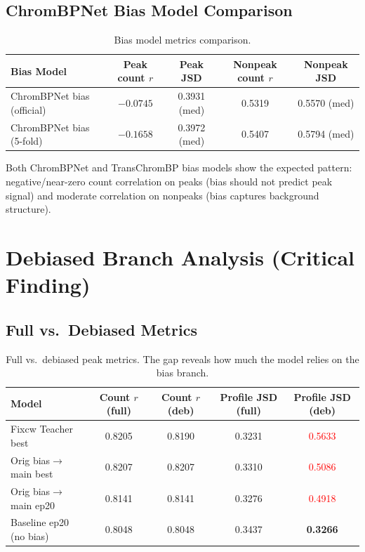 \documentclass[11pt,a4paper]{article}
\newcommand{\worse}[1]{\textcolor{red}{#1}}
\newcommand{\good}[1]{\textcolor{goodgreen}{\textbf{#1}}}
\begin{document}
\subsection{ChromBPNet Bias Model Comparison}

\begin{table}[h]
\centering
\caption{Bias model metrics comparison.}
\label{tab:bias_metrics}
\small
\begin{tabular}{l c c c c}
\toprule
\textbf{Bias Model} & \textbf{Peak count $r$} & \textbf{Peak JSD} & \textbf{Nonpeak count $r$} & \textbf{Nonpeak JSD} \\
\midrule
ChromBPNet bias (official) & $-0.0745$ & 0.3931 (med) & 0.5319 & 0.5570 (med) \\
ChromBPNet bias (5-fold) & $-0.1658$ & 0.3972 (med) & 0.5407 & 0.5794 (med) \\
\bottomrule
\end{tabular}
\end{table}

Both ChromBPNet and TransChromBP bias models show the expected pattern: negative/near-zero count correlation on peaks (bias should not predict peak signal) and moderate correlation on nonpeaks (bias captures background structure).

\section{Debiased Branch Analysis (Critical Finding)}
\label{sec:debiased}

\subsection{Full vs.\ Debiased Metrics}

\begin{table}[h]
\centering
\caption{Full vs.\ debiased peak metrics. The gap reveals how much the model relies on the bias branch.}
\label{tab:debiased}
\small
\begin{tabular}{l c c c c}
\toprule
\textbf{Model} & \textbf{Count $r$ (full)} & \textbf{Count $r$ (deb)} & \textbf{Profile JSD (full)} & \textbf{Profile JSD (deb)} \\
\midrule
Fixcw Teacher best & 0.8205 & 0.8190 & 0.3231 & \worse{0.5633} \\
Orig bias$\to$main best & 0.8207 & 0.8207 & 0.3310 & \worse{0.5086} \\
Orig bias$\to$main ep20 & 0.8141 & 0.8141 & 0.3276 & \worse{0.4918} \\
Baseline ep20 (no bias) & 0.8048 & 0.8048 & 0.3437 & \good{0.3266} \\
\bottomrule
\end{tabular}
\end{table}
\end{document}
